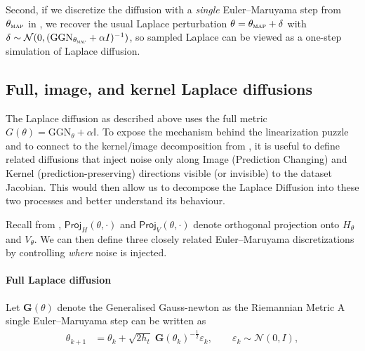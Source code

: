 Second, if we discretize the diffusion with a \emph{single}
Euler--Maruyama step from $\theta_{\textsc{map}}$ in , we recover the usual Laplace perturbation
$\theta=\theta_{\textsc{map}}+\delta$ with $\delta\sim\mathcal N(0,(\mathrm{GGN}_{\theta_{\textsc{map}}}+\alpha I)^{-1})$,
so sampled Laplace can be viewed as a one-step simulation of Laplace diffusion.


\subsection{Full, image, and kernel Laplace diffusions}
\label{subsec:full_image_kernel_diffusions}

The Laplace diffusion as described above uses the full metric $G(\theta)=\mathrm{GGN}_\theta+\alpha \mathbb{I}$.
To expose the mechanism behind the linearization puzzle and to connect to the kernel/image decomposition from , it is useful to define related diffusions that inject noise only along Image (Prediction Changing) and Kernel (prediction-preserving) directions visible (or invisible) to the dataset Jacobian. This would then allow us to decompose the Laplace Diffusion into these two processes and better understand its behaviour. 


Recall from , $\textsf{Proj}_H(\theta,\cdot)$ and $\textsf{Proj}_V(\theta,\cdot)$ denote orthogonal projection onto
$H_\theta$ and $V_\theta$. We can then define three closely related Euler--Maruyama discretizations by controlling \emph{where} noise is injected.

\medskip

\paragraph{Full Laplace diffusion}
Let $\mathbf{G}(\theta)$ denote the Generalised Gauss-newton as the Riemannian Metric
A single Euler--Maruyama step can be written as
\begin{align}
\label{eq:full_diffusion_em_primitive}
\theta_{k+1}
&=
\theta_k
+
\sqrt{2h_t}\;\mathbf{G}(\theta_k)^{-\frac{1}{2}}\!\varepsilon_k,
\qquad
\varepsilon_k\sim\mathcal N(0,I),
\end{align}


